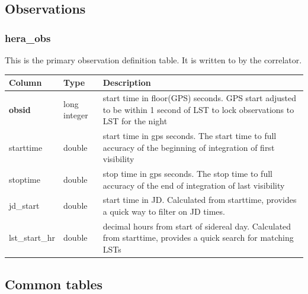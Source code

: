 \documentclass{article}
\begin{document}
\subsection{Observations}
\subsubsection{hera\_obs}
This is the primary observation definition table. It is written to by the correlator.

\begin{center}
 \begin{tabular}{| p{4cm} | p{2cm} | p{10cm} |}
 \hline
 {\bf Column} & {\bf Type}  & {\bf Description} \\ [0.5ex]  \hline\hline
 \textbf{obsid} & long integer & start time in floor(GPS) seconds. GPS start adjusted to be within 1 second of LST to lock observations to LST for the night \\ \hline
 starttime & double & start time in gps seconds. The start time to full accuracy of the beginning of integration of first visibility \\\hline
 stoptime & double & stop time in gps seconds. The stop time to full accuracy of the end of integration of last visibility \\\hline
 jd\_start & double & start time in JD. Calculated from starttime, provides a quick way to filter on JD times. \\\hline
 lst\_start\_hr & double & decimal hours from start of sidereal day. Calculated from starttime, provides a quick search for matching LSTs \\\hline
 \end{tabular}
\end{center}

\subsection{Common tables}
\end{document}
